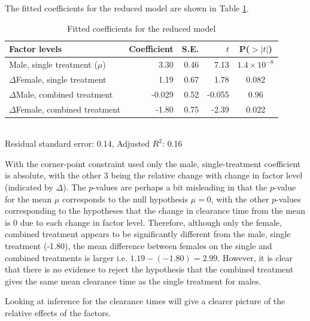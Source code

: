The fitted coefficients for the reduced model are shown in Table \ref{coefreduced}.
\begin{table}[h]
\centering
\caption{Fitted coefficients for the reduced model}\label{coefreduced}
\begin{tabular}{l|rrrc}
Factor levels&Coefficient&S.E.&$t$&P($>|t|$)\\
\hline
Male, single treatment ($\mu$)			& 3.30 & 0.46 & 7.13 &  $1.4\times 10^{-8}$ \\
$\Delta$Female, single treatment		& 1.19 & 0.67 & 1.78 & 0.082  \\
$\Delta$Male, combined treatment		& -0.029 & 0.52 & -0.055 & 0.96  \\
$\Delta$Female, combined treatment	& -1.80 & 0.75 & -2.39 & 0.022  \\
\hline
\end{tabular}\\
Residual standard error: 0.14, Adjusted $R^{2}$: 0.16
\end{table}

With the corner-point constraint used only the male, single-treatment coefficient is absolute, with the other 3 being the relative change with change in factor level (indicated by $\Delta$). The $p$-values are perhaps a bit misleading in that the $p$-value for the mean $\mu$ corresponds to the null hypothesis $\mu=0$, with the other $p$-values corresponding to the hypotheses that the change in clearance time from the mean is 0 due to each change in factor level. Therefore, although only the female, combined treatment appears to be significantly different from the male, single treatment (-1.80), the mean difference between females on the single and combined treatments is larger i.e. $1.19-(-1.80)=2.99$. However, it is clear that there is no evidence to reject the hypothesis that the combined treatment gives the same mean clearance time as the single treatment for males.

Looking at inference for the clearance times will give a clearer picture of the relative effects of the factors.
